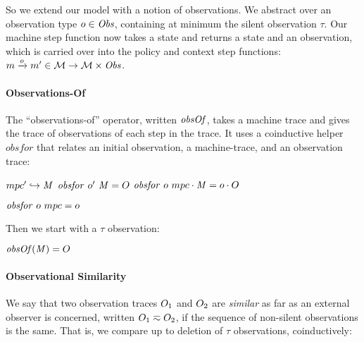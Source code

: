 \documentclass[acmsmall,review,anonymous]{acmart}\settopmatter{printfolios=true,printccs=false,printacmref=false}
\begin{document}
{So we extend our model with a notion of observations. We abstract over an
observation type \(\obs \in \OBSS\), containing at minimum the silent observation
\(\tau\). Our machine step function now takes a state and returns a state and an observation,
which is carried over into the policy and context step functions:
%
$\mach \stepsto[\obs] \mach' \in \MACHS \rightarrow \MACHS \times \OBSS $.
%

\paragraph*{Observations-Of}

The ``observations-of'' operator, written \(\obsof\), takes a machine trace and
gives the trace of observations of each step in
the trace. It uses a coinductive helper \(\mathit{obsfor}\) that relates an
initial observation, a machine-trace, and an observation trace:

\begin{minipage}[b]{.6\textwidth}
                {\(\mpcstatename' \hookrightarrow \MPCT\)}
                {\(\mathit{obsfor} ~ \obs' ~ \MPCT = \obsT\)}
                {\(\mathit{obsfor} ~ \obs ~ \notfinished{\mpcstatename}{\MPCT} = \notfinished{\obs}{\obsT}\)}%
\end{minipage}
\begin{minipage}[b]{.35\textwidth}
  \judgment{}
           {\(\mathit{obsfor} ~ \obs ~ \mpcstatename = \obs\)}
\end{minipage}

\begin{minipage}{.35\textwidth}
  Then we start with a \(\tau\) observation:
\end{minipage}
\begin{minipage}{.6\textwidth}
         {\(\obsof(\MPCT) = \obsT\)}
\end{minipage}

\paragraph*{Observational Similarity}

We say that two observation traces $\obsT_1$ and $\obsT_2$ are {\em similar}
as far as an external observer is concerned, written \(\obsT_1 \eqsim
\obsT_2\), if the sequence of non-silent observations is the same. That is, we
compare up to deletion of \(\tau\) observations, coinductively:

}
\end{document}
